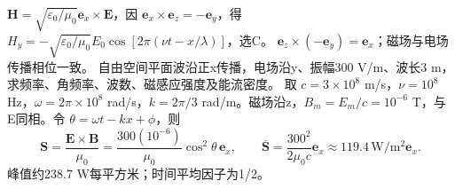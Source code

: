 \workings $\bm H=\sqrt{\varepsilon_0/\mu_0}\bm e_x\times\bm E$，因 $\bm e_x\times\bm e_z=-\bm e_y$，得 $H_y=-\sqrt{\varepsilon_0/\mu_0}E_0\cos[2\pi(\nu t-x/\lambda)]$，选C。
\crosscheck $\bm e_z\times(-\bm e_y)=\bm e_x$；磁场与电场传播相位一致。
\problemtext 自由空间平面波沿正x传播，电场沿y、振幅300 V/m、波长3 m，求频率、角频率、波数、磁感应强度及能流密度。
\workings 取 $c=3\times10^8$ m/s，$\nu=10^8$ Hz，$\omega=2\pi\times10^8$ rad/s，$k=2\pi/3$ rad/m。磁场沿z，$B_m=E_m/c=10^{-6}$ T，与E同相。令 $\theta=\omega t-kx+\phi$，则
\[
\bm S=\frac{\bm E\times\bm B}{\mu_0}
=\frac{300(10^{-6})}{\mu_0}\cos^2\theta\,\bm e_x,\qquad
\overline{\bm S}=\frac{300^2}{2\mu_0c}\bm e_x\approx119.4\,\mathrm{W/m^2}\bm e_x .
\]
\crosscheck 峰值约238.7 W每平方米；时间平均因子为1/2。
